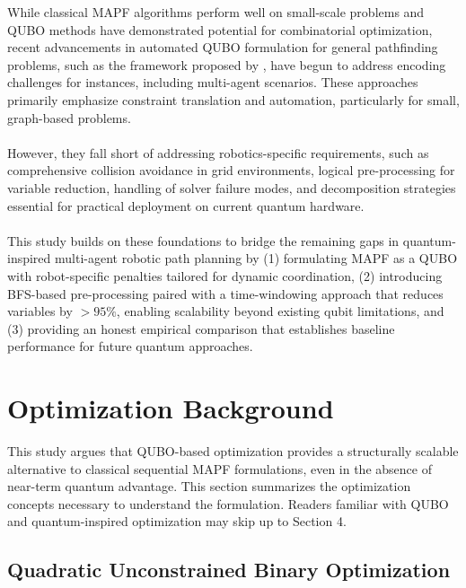 \documentclass[11pt]{article}
\begin{document}
While classical MAPF algorithms perform well on small-scale problems and QUBO methods have demonstrated potential for combinatorial optimization, recent advancements in automated QUBO formulation for general pathfinding problems, such as the framework proposed by \cite{rovara2024frameworkformulatepathfindingproblems}, have begun to address encoding challenges for instances, including multi-agent scenarios. These approaches primarily emphasize constraint translation and automation, particularly for small, graph-based problems.\\
\\
However, they fall short of addressing robotics-specific requirements, such as comprehensive collision avoidance in grid environments, logical pre-processing for variable reduction, handling of solver failure modes, and decomposition strategies essential for practical deployment on current quantum hardware.\\
\\
This study builds on these foundations to bridge the remaining gaps in quantum-inspired multi-agent robotic path planning by (1) formulating MAPF as a QUBO with robot-specific penalties tailored for dynamic coordination, (2) introducing BFS-based pre-processing paired with a time-windowing approach that reduces variables by $  >95\%  $, enabling scalability beyond existing qubit limitations, and (3) providing an honest empirical comparison that establishes baseline performance for future quantum approaches.

\section{Optimization Background}

This study argues that QUBO-based optimization provides a structurally scalable alternative to classical sequential MAPF formulations, even in the absence of near-term quantum advantage. This section summarizes the optimization concepts necessary to understand the formulation. Readers familiar with QUBO and quantum-inspired optimization may skip up to Section 4.

\subsection{Quadratic Unconstrained Binary Optimization}
\end{document}
